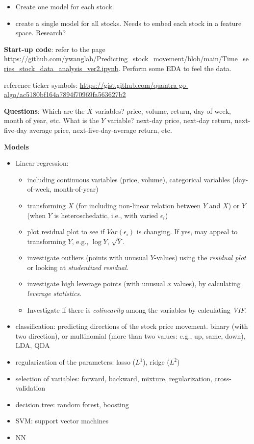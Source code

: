 \documentclass[
  letterpaper,
  DIV=11,
  numbers=noendperiod]{scrreprt}
\providecommand{\tightlist}{%
  \setlength{\itemsep}{0pt}\setlength{\parskip}{0pt}}\usepackage{longtable,booktabs,array}
\begin{document}
\begin{itemize}
\tightlist
\item
  Create one model for each stock.
\item
  create a single model for all stocks. Needs to embed each stock in a
  feature space. Research?
\end{itemize}

\textbf{Start-up code}: refer to the page
\url{https://github.com/ywanglab/Predicting_stock_movement/blob/main/Time_series_stock_data_analysis_ver2.ipynb}.
Perform some EDA to feel the data.

reference ticker symbols:
\url{https://gist.github.com/quantra-go-algo/ac5180bf164a7894f70969fa563627b2}

\textbf{Questions}: Which are the \(X\) variables? price, volume,
return, day of week, month of year, etc. What is the \(Y\) variable?
next-day price, next-day return, next-five-day average price,
next-five-day-average return, etc.

\textbf{Models}

\begin{itemize}
\item
  Linear regression:

  \begin{itemize}
  \tightlist
  \item
    including continuous variables (price, volume), categorical
    variables (day-of-week, month-of-year)
  \item
    transforming \(X\) (for including non-linear relation between \(Y\)
    and \(X\)) or \(Y\) (when \(Y\) is heteroschedatic, i.e., with
    varied \(\epsilon_i\))
  \item
    plot residual plot to see if \(Var(\epsilon_i)\) is changing. If
    yes, may appeal to transforming \(Y\), e.g., \(\log Y\),
    \(\sqrt{Y}\).
  \item
    investigate outliers (points with unusual \(Y\)-values) using the
    \emph{residual plot} or looking at \emph{studentized residual}.
  \item
    investigate high leverage points (with unusual \(x\) values), by
    calculating \emph{leverage statistics}.
  \item
    Investigate if there is \emph{colinearity} among the variables by
    calculating \emph{VIF}.
  \end{itemize}
\item
  classification: predicting directions of the stock price movement.
  binary (with two direction), or multinomial (more than two values:
  e.g., up, same, down), LDA, QDA
\item
  regularization of the parameters: lasso (\(L^1\)), ridge (\(L^2\))
\item
  selection of variables: forward, backward, mixture, regularization,
  cross-validation
\item
  decision tree: random forest, boosting
\item
  SVM: support vector machines
\item
  NN
\end{itemize}
\end{document}
